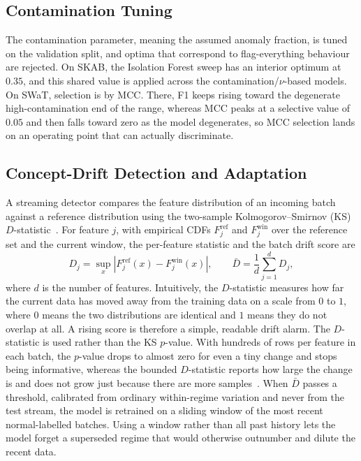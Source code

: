 \documentclass[runningheads]{llncs}
\begin{document}
\subsection{Contamination Tuning}
The contamination parameter, meaning the assumed anomaly fraction, is tuned on
the validation split, and optima that correspond to flag-everything behaviour are
rejected. On SKAB, the Isolation Forest sweep has an interior optimum at $0.35$,
and this shared value is applied across the contamination/$\nu$-based models. On
SWaT, selection is by MCC. There, F1 keeps rising toward the degenerate
high-contamination end of the range, whereas MCC peaks at a selective value of
$0.05$ and then falls toward zero as the model degenerates, so MCC selection
lands on an operating point that can actually discriminate.

\subsection{Concept-Drift Detection and Adaptation}
\label{sec:driftmethod}
A streaming detector compares the feature distribution of an incoming batch
against a reference distribution using the two-sample Kolmogorov--Smirnov (KS)
$D$-statistic~\cite{massey1951}. For feature $j$, with empirical CDFs
$F^{\mathrm{ref}}_j$ and $F^{\mathrm{win}}_j$ over the reference set and the
current window, the per-feature statistic and the batch drift score are
\begin{equation}
D_j = \sup_{x}\left| F^{\mathrm{ref}}_j(x) - F^{\mathrm{win}}_j(x) \right|,
\qquad
\bar{D} = \frac{1}{d}\sum_{j=1}^{d} D_j,
\end{equation}
where $d$ is the number of features. Intuitively, the $D$-statistic measures how
far the current data has moved away from the training data on a scale from $0$ to
$1$, where $0$ means the two distributions are identical and $1$ means they do not
overlap at all. A rising score is therefore a simple, readable drift alarm. The
$D$-statistic is used rather than the KS $p$-value. With hundreds of rows per
feature in each batch, the $p$-value drops to almost zero for even a tiny change
and stops being informative, whereas the bounded $D$-statistic reports how large
the change is and does not grow just because there are more samples~\cite{gama2014}. When $\bar{D}$ passes a threshold, calibrated from ordinary
within-regime variation and never from the test stream, the model is retrained on
a sliding window of the most recent normal-labelled batches. Using a window rather than all past history
lets the model forget a superseded regime that would otherwise outnumber and
dilute the recent data.
\end{document}
